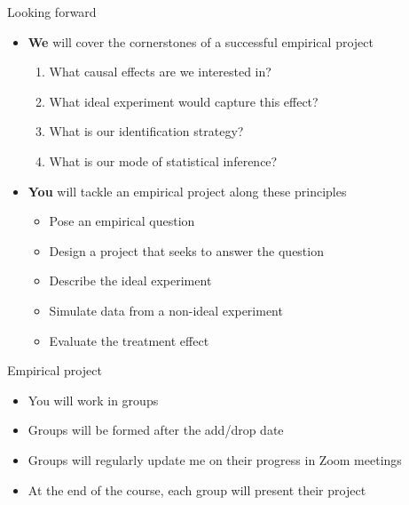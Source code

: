 \documentclass[aspectratio=169,compress,handout,t,xcolor=table]{beamer}
\begin{document}
\begin{frame}{Looking forward}
  \begin{itemize}    
    \item \textbf{We} will cover the cornerstones of a successful empirical project
    \begin{enumerate}
      \addtolength{\itemsep}{0.5\baselineskip}
      \item What causal effects are we interested in?
      \item What ideal experiment would capture this effect?
      \item What is our identification strategy?
      \item What is our mode of statistical inference?
    \end{enumerate}
    \item \textbf{You} will tackle an empirical project along these principles
    \begin{itemize}
      \item Pose an empirical question
      \item Design a project that seeks to answer the question
      \item Describe the ideal experiment
      \item Simulate data from a non-ideal experiment
      \item Evaluate the treatment effect
    \end{itemize}
  \end{itemize}  
\end{frame}

\begin{frame}{Empirical project}
  \begin{itemize}
    \item You will work in groups
    \item Groups will be formed after the add/drop date
    \item Groups will regularly update me on their progress in Zoom meetings
    \item At the end of the course, each group will present their project
  \end{itemize}
\end{frame}
\end{document}

